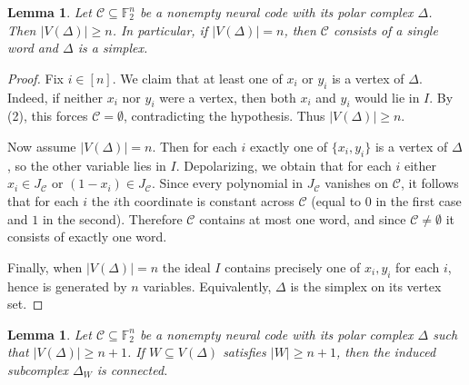 \documentclass[12pt]{amsart}
\newtheorem{lemma}[theorem]{Lemma}
\theoremstyle{remark}
\theoremstyle{definition}
\newcommand{\F}{\mathbb{F}}
\newcommand{\C}{\mathcal{C}}
\begin{document}
\begin{lemma}\label{lem:vertex_size} 
   Let $\C\subseteq \F_2^n$ be a nonempty neural code with its polar complex $\Delta$. Then $|V(\Delta)|\ge n$. In particular, if $|V(\Delta)|=n$, then $\C$ consists of a single word and $\Delta$ is a simplex.
\end{lemma}


\begin{proof}
Fix $i\in[n]$. We claim that at least one of $x_i$ or $y_i$ is a vertex of $\Delta$.
Indeed, if neither $x_i$ nor $y_i$ were a vertex, then both $x_i$ and $y_i$ would lie in $I$.
By (2), this forces $\C=\emptyset$, contradicting the hypothesis.
Thus $|V(\Delta)|\ge n$.

Now assume $|V(\Delta)|=n$. Then for each $i$ exactly one of $\{x_i,y_i\}$ is a vertex of $\Delta$,
so the other variable lies in $I$. Depolarizing, we obtain that for each $i$ either $x_i\in J_\C$
or $(1-x_i)\in J_\C$. Since every polynomial in $J_\C$ vanishes on $\C$, it follows that for each $i$
the $i$th coordinate is constant across $\C$ (equal to $0$ in the first case and $1$ in the second).
Therefore $\C$ contains at most one word, and since $\C\neq\emptyset$ it consists of exactly one word.

Finally, when $|V(\Delta)|=n$ the ideal $I$ contains precisely one of $x_i,y_i$ for each $i$, hence is
generated by $n$ variables. Equivalently, $\Delta$ is the simplex on its vertex set.
\end{proof}



\begin{lemma}\label{lem:DW-connected-largeW}
Let $\C\subseteq \F_2^n$ be a nonempty neural code with its  polar complex $\Delta$ such that $|V(\Delta)|\ge n+1$.
If $W\subseteq V(\Delta)$ satisfies $|W|\ge n+1$, then the induced subcomplex $\Delta_W$ is connected.
\end{lemma}
\end{document}
